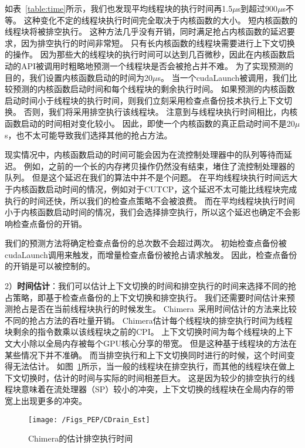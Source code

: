 如表~\ref{table:time}所示，我们也发现平均线程块的执行时间再1.5$\mu$s到超过900$\mu$s不等。
这种变化不定的线程块执行时间完全取决于内核函数的大小。
短内核函数的线程块将被排空执行。
这种方法几乎没有开销，同时满足抢占内核函数的延迟要求，因为排空执行的时间非常短。
只有长内核函数的线程块需要进行上下文切换的操作。
因为那些大的线程块的执行时间可以达到几百微秒，因此在内核函数启动的API被调用时粗略地预测一个线程块是否会被抢占并不难。
为了实现预测的目的，我们设置内核函数启动的时间为20$\mu$s。
当一个cudaLaunch被调用，我们比较预测的内核函数启动时间和每个线程块的剩余执行时间。
如果预测的内核函数启动时间小于线程块的执行时间，则我们立刻采用检查点备份技术执行上下文切换。
否则，我们将采用排空执行该线程块。
注意到与线程块执行时间相比，内核函数启动的时间相对变化较小。
因此，即使一个内核函数的真正启动时间不是20$\mu$s，也不太可能导致我们选择其他的抢占方法。

现实情况中，内核函数启动的时间可能会因为在流控制处理器中的队列等待而延迟。
例如，之前的一个长的内存拷贝操作仍然没有结束，堵住了流控制处理器的队列。
但是这个延迟在我们的算法中并不是个问题。
在平均线程块执行时间远大于内核函数启动时间的情况，例如对于CUTCP，这个延迟不太可能比线程块完成执行的时间还快，所以我们的检查点策略不会被浪费。
而在平均线程块执行时间小于内核函数启动时间的情况，我们会选择排空执行，所以这个延迟也确定不会影响检查点备份的开销。

我们的预测方法将确定检查点备份的总次数不会超过两次。
初始检查点备份被cudaLaunch调用来触发，而增量检查点备份被抢占请求触发。
因此，检查点备份的开销是可以被控制的。

2）\textbf{时间估计}：我们可以估计上下文切换的时间和排空执行的时间来选择不同的抢占策略，即基于检查点备份的上下文切换和排空执行。
我们还需要时间估计来预测抢占是否在当前线程块执行的时候发生。
Chimera~采用时间估计的方法来比较不同的抢占方法的吞吐量开销。
Chimera估计每个线程块的排空执行时间为线程块剩余的指令数乘以该线程块之前的CPI。
上下文切换时间为每个线程块的上下文大小除以全局内存被每个GPU核心分享的带宽。
但是这种基于线程块的方法在某些情况下并不准确。
而当排空执行和上下文切换同时进行的时候，这个时间变得无法估计。
如图~\ref{fig:CDrain_Est}所示，当一般的线程块在排空执行，而其他的线程块在做上下文切换时，估计的时间与实际的时间相差巨大。
这是因为较少的排空执行的线程块意味着在流处理器（SP）较小的冲突，上下文切换的线程块在全局内存的带宽上出现更多的冲突。


\begin{figure}[htbp] %
  \centering
  \texttt{[image: /Figs\_PEP/CDrain\_Est]}
  \caption{Chimera的估计排空执行时间}
  \label{fig:CDrain_Est}
\end{figure}


